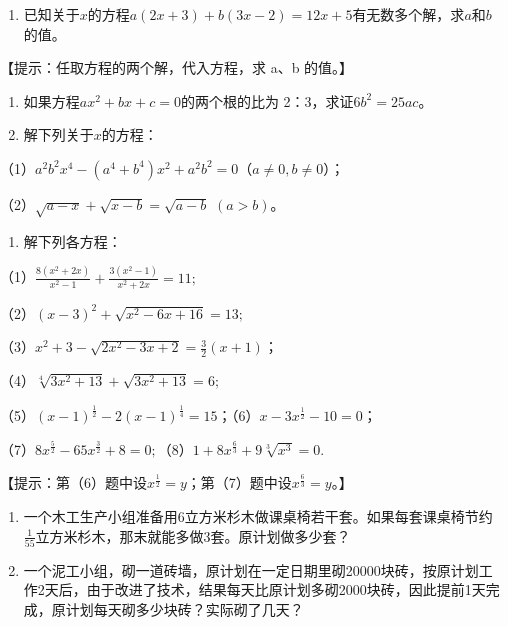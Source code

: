 \begin{enumerate}[start=7]
\item
  已知关于\(x\)的方程\(a(2x + 3) + b(3x - 2) = 12x + 5\)有无数多个解，求\(a\)和\(b\)的值。
\end{enumerate}

【提示：任取方程的两个解，代入方程，求 a、b 的值。】

\begin{enumerate}[start=8]
\item
  如果方程\(ax^2 + bx + c = 0\)的两个根的比为
  2：3，求证\(6b^2 = 25ac\)。
\item
  解下列关于\(x\)的方程：
\end{enumerate}

（1）\(a^2 b^2 x^4 - (a^4 + b^4)x^2 + a^2 b^2 = 0\)（\(a \neq 0, b \neq 0\)）；

（2）\(\sqrt{a - x} + \sqrt{x - b} = \sqrt{a - b}\) \((a > b)\)。

\begin{enumerate}[start=10]
\item
  解下列各方程：
\end{enumerate}

（1）\(\frac{8(x^2 + 2x)}{x^2 - 1} + \frac{3(x^2 - 1)}{x^2 + 2x} = 11;\)

（2）\((x - 3)^{2} + \sqrt{x^{2} - 6x + 16} = 13;\)

（3）\(x^{2} + 3 - \sqrt{2x^{2} - 3x + 2} = \frac{3}{2} (x + 1)\)；

（4）\(\sqrt[4]{3x^2 + 13} + \sqrt{3x^2 + 13} = 6;\)

（5）\((x - 1)^{\frac{1}{2}} - 2(x - 1)^{\frac{1}{4}} = 15\)；（6）\(x - 3x^{\frac{1}{2}} - 10 = 0\)；

（7）\(8x^{\frac{5}{2}} - 65x^{\frac{3}{2}} + 8 = 0;\)（8）\(1 + 8x^{\frac{6}{3}} + 9\sqrt[3]{x^3} = 0.\)

【提示：第（6）题中设\(x^{\frac{1}{2}}=y\)；第（7）题中设\(x^{\frac{6}{3}}=y\)。】

\begin{enumerate}[start=11]
\item
  一个木工生产小组准备用6立方米杉木做课桌椅若干套。如果每套课桌椅节约\(\frac{1}{55}\)立方米杉木，那末就能多做3套。原计划做多少套？
\item
  一个泥工小组，砌一道砖墙，原计划在一定日期里砌20000块砖，按原计划工作2天后，由于改进了技术，结果每天比原计划多砌2000块砖，因此提前1天完成，原计划每天砌多少块砖？实际砌了几天？
\end{enumerate}

